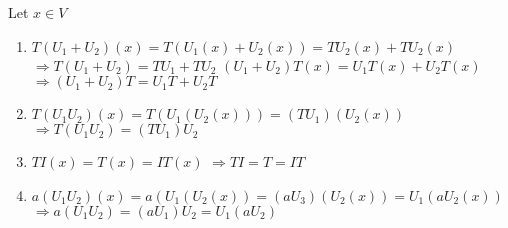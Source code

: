 Let $x \in V $

\begin{enumerate}
\item \(T\left(U_{1}+U_{2}\right)(x)=T\left(U_{1}(x)+U_{2}(x)\right)=T U_{2}(x)+T U_{2}(x)\)
\(\Rightarrow T\left(U_{1}+U_{2}\right)=T U_{1}+T U_{2}\)
\(\left(U_{1}+U_{2}\right) T(x)=U_{1} T(x)+U_{2} T(x)\)
\(\Rightarrow\left(U_{1}+U_{2}\right) T=U_{1} T+U_{2} T\)
\item \(T\left(U_{1} U_{2}\right)(x)=T\left(U_{1}\left(U_{2}(x)\right)\right)=\left(T U_{1}\right)\left(U_{2}(x)\right)\)
\(\Rightarrow T\left(U_{1} U_{2}\right)=\left(T U_{1}\right) U_{2}\)
\item \(T I(x)=T(x)=I T(x)\) \(\Rightarrow T I=T=I T\)
\item  \(a\left(U_{1} U_{2}\right)(x)=a\left(U_{1}\left(U_{2}(x)\right)=\left(a U_{3}\right)\left(U_{2}(x)\right)=U_{1}\left(a U_{2}(x)\right)\right.\)
\(\Rightarrow a\left(U_{1} U_{2}\right)=\left(a U_{1}\right) U_{2}=U_{1}\left(a U_{2}\right) \quad\)

\end{enumerate}
 